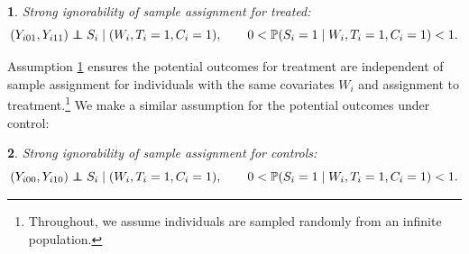 \documentclass[hidelinks,12pt]{article}
\makeatletter
\newtheorem*{assumption*}{\assumptionnumber}
\providecommand{\assumptionnumber}{}
\newenvironment{assumption}[2]
 {%
  \renewcommand{\assumptionnumber}{Assumption #1}%
  \begin{assumption*}%
  \protected@edef\@currentlabel{#1}%
 }
 {%
  \end{assumption*}
 }
\newcommand{\pr}{\mathbb{P}} %
\newcommand\independent{\protect\mathpalette{\protect\independenT}{\perp}}
\def\independenT#1#2{\mathrel{\rlap{$#1#2$}\mkern2mu{#1#2}}}
\makeatother
\begin{document}
\vskip 0.2in
\begin{assumption}{3}{}\label{si_treat}
	Strong ignorability of sample assignment for treated:
	\begin{equation*}
		(Y_{i01}, Y_{i11}) \independent S_i \mid (W_i, T_i=1,C_i=1), \qquad 0 < \pr(S_i=1 \mid W_i, T_i=1,C_i=1) <1.
	\end{equation*}
\end{assumption}

\noindent Assumption \ref{si_treat} ensures the potential outcomes for treatment are independent of sample assignment for individuals with the same covariates $W_i$ and assignment to treatment.\footnote{Throughout, we assume individuals are sampled randomly from an infinite population.} We make a similar assumption for the potential outcomes under control: 

\vskip 0.2in
\begin{assumption}{4}{}\label{si_ctrl}
	Strong ignorability of sample assignment for controls:
	\begin{equation*}
		(Y_{i00}, Y_{i10}) \independent S_i \mid (W_i, T_i=1,C_i= 1), \qquad 0 < \pr(S_i=1 \mid W_i, T_i=1,C_i=1) <1. 
\end{equation*}\end{assumption}

\color{red}
\end{document}
